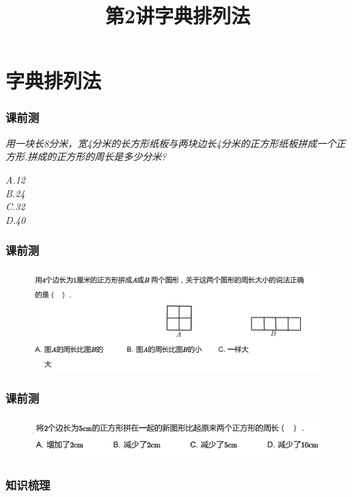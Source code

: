 \section{字典排列法}

\title[第2讲\quad 字典排列法]{第2讲\quad 字典排列法} 
\author{}
\date{}
\begin{frame}
    \titlepage
\end{frame}

\begin{frame}
    \frametitle{课前测}
    \textit{用一块长8分米，宽4分米的长方形纸板与两块边长4分米的正方形纸板拼成一个正方形.拼成的正方形的周长是多少分米?}

    \textit{A.12\\ B.24\\ C.32\\ D.40}
\end{frame}

\begin{frame}
    \frametitle{课前测}
    \begin{figure}[H] 
        \centering
        \includegraphics[width=1\textwidth]{./pics/Chapter_2/keqian2.png}
    \end{figure}
\end{frame}

\begin{frame}
    \frametitle{课前测}
    \begin{figure}[H] 
        \centering
        \includegraphics[width=1\textwidth]{./pics/Chapter_2/keqian3.png}
    \end{figure}
\end{frame}

\begin{frame}
    \frametitle{知识梳理}
\end{frame}

